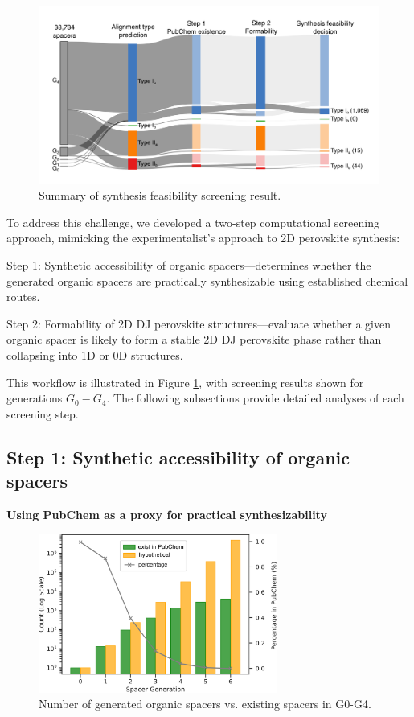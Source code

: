 \begin{figure}[htbp]
    \centering
    \includegraphics[width=\textwidth]{figures/synthesis-feasibility/figure5-1.png}
    \caption{Summary of synthesis feasibility screening result.}
    \label{fig:figure5.1}
\end{figure}

To address this challenge, we developed a two-step computational screening approach, mimicking the experimentalist’s approach to 2D perovskite synthesis: 

Step 1: Synthetic accessibility of organic spacers—determines whether the generated organic spacers are practically synthesizable using established chemical routes.

Step 2: Formability of 2D DJ perovskite structures—evaluate whether a given organic spacer is likely to form a stable 2D DJ perovskite phase rather than collapsing into 1D or 0D structures.

This workflow is illustrated in Figure \ref{fig:figure5.1}, with screening results shown for generations $G_0-G_4$. The following subsections provide detailed analyses of each screening step.

\subsection{Step 1: Synthetic accessibility of organic spacers}

\textbf{Using PubChem as a proxy for practical synthesizability}

\begin{figure}[htbp]
    \centering
    \includegraphics[width=0.7\textwidth]{figures/synthesis-feasibility/figure5-2.png}
    \caption{Number of generated organic spacers vs. existing spacers in G0-G4.}
    \label{fig:figure5.2}
\end{figure}

